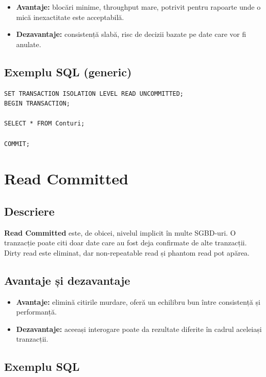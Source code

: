 \documentclass[11pt,a4paper]{article}
\begin{document}
\begin{itemize}[leftmargin=1.5cm]
  \item \textbf{Avantaje:} blocări minime, throughput mare, potrivit pentru rapoarte unde o mică inexactitate este acceptabilă.
  \item \textbf{Dezavantaje:} consistență slabă, risc de decizii bazate pe date care vor fi anulate.
\end{itemize}

\subsection{Exemplu SQL (generic)}

\begin{verbatim}
SET TRANSACTION ISOLATION LEVEL READ UNCOMMITTED;
BEGIN TRANSACTION;

SELECT * FROM Conturi;

COMMIT;
\end{verbatim}

\section{Read Committed}

\subsection{Descriere}

\textbf{Read Committed} este, de obicei, nivelul implicit în multe SGBD-uri. O tranzacție poate citi doar date care au fost deja confirmate de alte tranzacții. Dirty read este eliminat, dar non-repeatable read și phantom read pot apărea.

\subsection{Avantaje și dezavantaje}

\begin{itemize}[leftmargin=1.5cm]
  \item \textbf{Avantaje:} elimină citirile murdare, oferă un echilibru bun între consistență și performanță.
  \item \textbf{Dezavantaje:} aceeași interogare poate da rezultate diferite în cadrul aceleiași tranzacții.
\end{itemize}

\subsection{Exemplu SQL}
\end{document}
